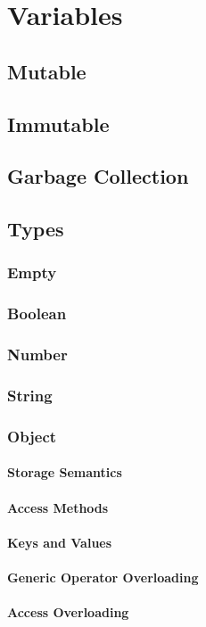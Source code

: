 \documentclass[12pt,letterpaper]{report}
\begin{document}
\chapter{Variables}
\section{Mutable}
\section{Immutable}
\section{Garbage Collection}
\section{Types}
\subsection{Empty}
\subsection{Boolean}
\subsection{Number}
\subsection{String}
\subsection{Object}
\subsubsection{Storage Semantics}
\subsubsection{Access Methods}
\subsubsection{Keys and Values}    
\subsubsection{Generic Operator Overloading}    
\subsubsection{Access Overloading}
\end{document}
